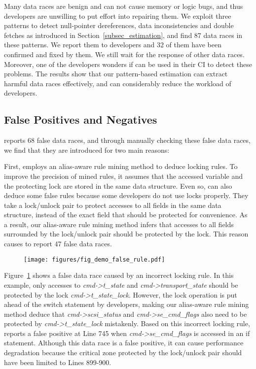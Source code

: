  Many data races are benign and can not cause memory 
or logic bugs, and thus developers are unwilling to put effort into repairing 
them. We exploit three patterns to detect null-pointer dereferences, data 
inconsistencies and double fetches as introduced in 
Section~\ref{subsec_estimation}, and find 87 data races in these patterns. We 
report them to developers and 32 of them have been confirmed and fixed by them. 
We still wait for the response of other data races. Moreover, one of the 
developers wonders if \sys can be used in their CI to detect these problems. 
The results show that our pattern-based estimation can extract harmful data 
races effectively, and can considerably reduce the workload of developers.

\subsection{False Positives and Negatives}
\label{subsec_false_pos_neg}
 \sys reports 68 false data races, and through manually 
checking these false data races, we find that they are introduced for two main 
reasons:

First, \sys employs an alias-aware rule mining method to deduce locking rules. 
To improve the precision of mined rules, it assumes that the accessed variable 
and the protecting lock are stored in the same data structure. Even so, \sys 
can also deduce some false rules because some developers do not use locks 
properly. They take a lock/unlock pair to protect accesses to all fields in the 
same data structure, instead of the exact field that should be protected for 
convenience. As a result, our alias-aware rule mining method infers that 
accesses to all fields surrounded by the lock/unlock pair should be protected 
by the lock. This reason causes \sys to report 47 false data races.

\begin{figure}[htbp]
	\centering
	\texttt{[image: figures/fig\_demo\_false\_rule.pdf]}
	\label{fig_demo_false_rule}
\end{figure}

Figure~\ref{fig_demo_false_rule} shows a false data race caused by an incorrect 
locking rule. In this example, only accesses to {\em cmd->t\_state} and {\em 
cmd->transport\_state} should be protected by the lock {\em 
cmd->t\_state\_lock}. However, the lock operation is put ahead of the switch 
statement by developers, making our alias-aware rule mining method deduce that 
{\em cmd->scsi\_status} and {\em cmd->se\_cmd\_flags} also need to be protected 
by {\em cmd->t\_state\_lock} mistakenly. Based on this incorrect locking rule, 
\sys reports a false positive at Line 745 when {\em cmd->se\_cmd\_flags} is 
accessed in an if statement. Although this data race is a false positive, it 
can cause performance degradation because the critical zone protected by the 
lock/unlock pair should have been limited to Lines 899-900.


